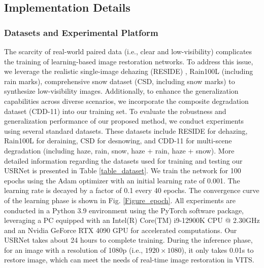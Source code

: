 \documentclass[final,12pt]{elsarticle}
\begin{document}
\subsection{Implementation Details}
%
\subsubsection{Datasets and Experimental Platform}
    The scarcity of real-world paired data  (i.e., clear and low-visibility) complicates the training of learning-based image restoration networks. To address this issue, we leverage the realistic single-image dehazing (RESIDE) \citep{li2018benchmarking}, Rain100L \citep{yang2019joint} (including rain marks), comprehensive snow dataset \citep{chen2021all} (CSD, including snow marks) \citep{guo2024onerestore} to synthesize low-visibility images. Additionally, to enhance the generalization capabilities across diverse scenarios, we incorporate the composite degradation dataset (CDD-11) \citep{guo2024onerestore} into our training set. To evaluate the robustness and generalization performance of our proposed method, we conduct experiments using several standard datasets. These datasets include RESIDE \citep{li2018benchmarking} for dehazing, Rain100L for deraining, CSD for desnowing, and CDD-11 for multi-scene degradation (including haze, rain, snow, haze + rain, haze + snow). More detailed information regarding the datasets used for training and testing our USRNet is presented in Table \ref{table_dataset}. We train the network for 100 epochs using the Adam optimizer with an initial learning rate of 0.001. The learning rate is decayed by a factor of 0.1 every 40 epochs. The convergence curve of the learning phase is shown in Fig. \ref{Figure_epoch}. All experiments are conducted in a Python 3.9 environment using the PyTorch software package, leveraging a PC equipped with an Intel(R) Core(TM) i9-12900K CPU @ 2.30GHz and an Nvidia GeForce RTX 4090 GPU for accelerated computations. Our USRNet takes about 24 hours to complete training. During the inference phase, for an image with a resolution of 1080p (i.e., $1920 \times 1080$), it only takes 0.01s to restore image, which can meet the needs of real-time image restoration in VITS.
    \setlength{\tabcolsep}{0.50pt}
\end{document}
